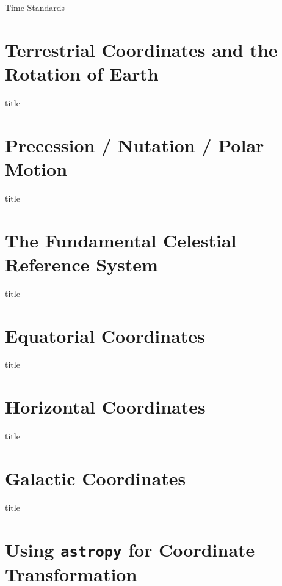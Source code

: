 \documentclass[aspectratio=1610, 9pt]{beamer}
\begin{document}
\begin{frame}{Time Standards}
\end{frame}

\section{Terrestrial Coordinates and the Rotation of Earth}
\begin{frame}{title}
\end{frame}

\section{Precession / Nutation / Polar Motion}
\begin{frame}{title}
\end{frame}

\section{The Fundamental Celestial Reference System}
\begin{frame}{title}
\end{frame}

\section{Equatorial Coordinates}
\begin{frame}{title}
\end{frame}

\section{Horizontal Coordinates}
\begin{frame}{title}
\end{frame}

\section{Galactic Coordinates}
\begin{frame}{title}
\end{frame}

\section{Using \texttt{astropy} for Coordinate Transformation}
\end{document}
